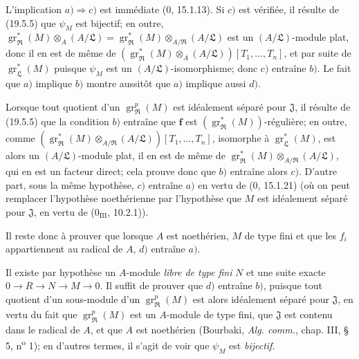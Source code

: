 L'implication $a)\Rightarrow c)$ est immédiate ($0$, 15.1.13). Si $c)$ est vérifiée, il résulte de (19.5.5) que $\psi_M$ est bijectif; en outre, $\operatorname{gr}_{\mathfrak R}^*(M)\otimes_A(A/\mathfrak L)=\operatorname{gr}_{\mathfrak R}^*(M)\otimes_{A/\mathfrak R}(A/\mathfrak L)$ est un $(A/\mathfrak L)$-module plat, donc il en est de même de $(\operatorname{gr}_{\mathfrak R}^*(M)\otimes_A(A/\mathfrak L))[T_1,\ldots,T_n]$, et par suite de $\operatorname{gr}_{\mathfrak L}^*(M)$ puisque $\psi_M$ est un $(A/\mathfrak L)$-isomorphisme; donc $c)$ entraîne $b)$. Le fait que $a)$ implique $b)$ montre aussitôt que $a)$ implique aussi $d)$.

Lorsque tout quotient d'un $\operatorname{gr}_{\mathfrak R}^p(M)$ est idéalement séparé pour $\mathfrak J$, il résulte de (19.5.5) que la condition $b)$ entraîne que $\mathbf f$ est $(\operatorname{gr}_{\mathfrak R}^*(M))$-régulière; en outre, comme $(\operatorname{gr}_{\mathfrak R}^*(M)\otimes_{A/\mathfrak R}(A/\mathfrak L))[T_1,\ldots,T_n]$, isomorphe à $\operatorname{gr}_{\mathfrak L}^*(M)$, est alors un $(A/\mathfrak L)$-module plat, il en est de même de $\operatorname{gr}_{\mathfrak R}^*(M)\otimes_{A/\mathfrak R}(A/\mathfrak L)$, qui en est un facteur direct; cela prouve donc que $b)$ entraîne alors $c)$. D'autre part, sous la même hypothèse, $c)$ entraîne $a)$ en vertu de ($0$, 15.1.21) (où on peut remplacer l'hypothèse noethérienne par l'hypothèse que $M$ est idéalement séparé pour $\mathfrak J$, en vertu de ($0_{\mathrm{III}}$, 10.2.1)).

Il reste donc à prouver que lorsque $A$ est noethérien, $M$ de type fini et que les $f_i$ appartiennent au radical de $A$, $d)$ entraîne $a)$.

Il existe par hypothèse un $A$-module \emph{libre de type fini} $N$ et une suite exacte $0\to R\to N\to M\to0$. Il suffit de prouver que $d)$ entraîne $b)$, puisque tout quotient d'un sous-module d'un $\operatorname{gr}_{\mathfrak R}^p(M)$ est alors idéalement séparé pour $\mathfrak J$, en vertu du fait que $\operatorname{gr}_{\mathfrak R}^p(M)$ est un $A$-module de type fini, que $\mathfrak J$ est contenu dans le radical de $A$, et que $A$ est noethérien (Bourbaki, \emph{Alg. comm.}, chap. III, § 5, n\textsuperscript{o} 1); en d'autres termes, il s'agit de voir que $\psi_M$ est \emph{bijectif}.

